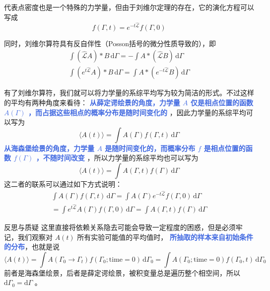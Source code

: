 代表点密度也是一个特殊的力学量，但由于刘维尔定理的存在，它的演化方程可以写成
\begin{equation}\label{equ:代表点密度的演化方程}
    f(\Gamma,t) =  e^{-t\mathcal{\hat L}}f(\Gamma,0)
\end{equation}

同时，刘维尔算符具有反自伴性（Posson括号的微分性质导致的），即
\begin{align}\label{equ:反自伴性}
    \int (\mathcal{\hat L}A)*B \,\mathrm{d}\Gamma= -\int A*(\mathcal{\hat L}B) \,\mathrm{d}\Gamma \\
    \int (e^{t\mathcal{\hat L}}A)*B \,\mathrm{d}\Gamma= \int A*(e^{-t\mathcal{\hat L}}B) \,\mathrm{d}\Gamma
\end{align}

有了刘维尔算符，我们就可以将力学量的系综平均写为较为简洁的形式。不过这样的平均有两种角度来看待： \textcolor{RoyalBlue}{\textbf{\kaishu 从薛定谔绘景的角度，力学量 $A$ 仅是相点位置的函数 $A(\Gamma)$ ，而占据这些相点的概率分布是随时间变化的}} ，因此力学量的系综平均可以写为
\begin{equation}\label{equ:力学量的系综平均，薛定谔绘景}
    \langle A(t) \rangle = \int A(\Gamma) f(\Gamma, t) \,\mathrm{d}\Gamma
\end{equation}
\textcolor{RoyalBlue}{\textbf{\kaishu 从海森堡绘景的角度，力学量 $A$ 是随时间变化的，而概率分布 $f$ 是相点位置的函数 $f(\Gamma)$ ，不随时间改变}} ，所以力学量的系综平均也可以写为
\begin{equation}\label{equ:力学量的系综平均，海森堡绘景}
    \langle A(t) \rangle = \int A(\Gamma,t) f(\Gamma) \,\mathrm{d}\Gamma
\end{equation}
这二者的联系可以通过如下方式说明：
\begin{align*}
    \int A(\Gamma) f(\Gamma, t) \,\mathrm{d}\Gamma = \int A(\Gamma) e^{-t\mathcal{\hat L}}f(\Gamma,0) \,\mathrm{d}\Gamma \\
    = \int e^{t\mathcal{\hat L}}A(\Gamma) f(\Gamma,0) \,\mathrm{d}\Gamma = \int A(\Gamma,t) f(\Gamma) \,\mathrm{d}\Gamma
\end{align*}
\begin{justification}{\kaishu 反思与质疑}
\kaishu \fontsize{11pt}{16pt}
    这里直接将依赖关系隐去可能会导致一定程度的困惑，但是必须牢记，我们观察对 $A(t)$ 所有实验可能值的平均值时， \textcolor{RoyalBlue}{\textbf{\kaishu  所抽取的样本来自初始条件的分布}}，也就是说
    \[
        \langle A(t) \rangle = \int A(\Gamma_0\rightarrow \Gamma_t) f(\Gamma_0; \text{time} = 0) \,\mathrm{d}\Gamma_0 = \int A(\Gamma_0;\text{time} = 0) f(\Gamma_0,t) \,\mathrm{d}\Gamma_0
    \]
    前者是海森堡绘景，后者是薛定谔绘景，被积变量总是遍历整个相空间，所以 $\mathrm{d}\Gamma_0 = \mathrm{d}\Gamma$ 。
\end{justification}


